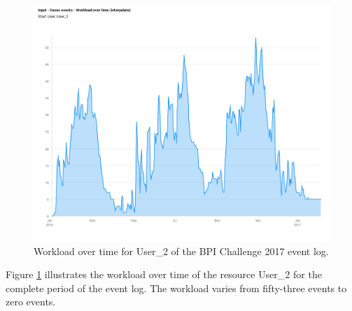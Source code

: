 
\begin{figure}[h]
	\centering
    \includegraphics[width=\textwidth]{figures/workload_interpolate.png}
    \caption{Workload over time for User\_2 of the BPI Challenge 2017 event log.}
    \label{fig:workload}
\end{figure}

Figure \ref{fig:workload} illustrates the workload over time of the resource User\_2 for the complete period of the event log. The workload varies from fifty-three events to zero events. 


